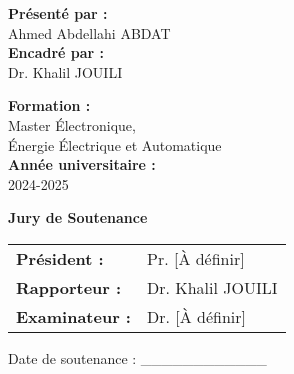 \documentclass[oneside, french, a4paper, 12pt, reqno]{book}
\begin{document}
\begin{titlepage}
\begin{center}
        \begin{minipage}{0.45\textwidth}
            \begin{flushleft}
                \large
                \textbf{Présenté par :}\\
                Ahmed Abdellahi ABDAT\\[0.5cm]
                \textbf{Encadré par :}\\
                Dr. Khalil JOUILI
            \end{flushleft}
        \end{minipage}
        \hfill
        \begin{minipage}{0.45\textwidth}
            \begin{flushright}
                \large
                \textbf{Formation :}\\
                Master Électronique,\\
                Énergie Électrique et Automatique\\[0.5cm]
                \textbf{Année universitaire :}\\
                2024-2025
            \end{flushright}
        \end{minipage}
        
        \vfill
        
        \begin{tcolorbox}[
            colback=white,
            colframe=gray75,
            boxrule=1pt,
            arc=2mm,
            width=0.8\textwidth,
            center
        ]
            \centering\large\textbf{Jury de Soutenance}\\[0.5cm]
            \begin{tabular}{ll}
                \textbf{Président :} & Pr. [À définir] \\
                \textbf{Rapporteur :} & Dr. Khalil JOUILI \\
                \textbf{Examinateur :} & Dr. [À définir] \\
            \end{tabular}
        \end{tcolorbox}
        
        \vspace{1cm}
        Date de soutenance : \_\_\_\_\_\_\_\_\_\_\_\_
    \end{center}
\end{titlepage}
\end{document}
